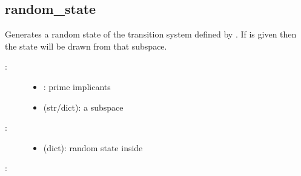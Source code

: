 \documentclass[letterpaper,10pt,english]{sphinxmanual}
\begin{document}
\subsection{random\_state}
\label{\detokenize{StateTransitionGraphs:id5}}\label{\detokenize{StateTransitionGraphs:random-state}}

\begin{fulllineitems}
\label{\detokenize{StateTransitionGraphs:PyBoolNet.StateTransitionGraphs.random_state}}
Generates a random state of the transition system defined by .
If  is given then the state will be drawn from that subspace.
\begin{description}
\item[{:}] \leavevmode\begin{itemize}
\item {} 
: prime implicants

\item {} 
 (str/dict): a subspace

\end{itemize}

\item[{:}] \leavevmode\begin{itemize}
\item {} 
 (dict): random state inside 

\end{itemize}

\end{description}

:

\begin{sphinxVerbatim}[commandchars=\\\{\}]
 
 
\end{sphinxVerbatim}

\end{fulllineitems}
\end{document}
